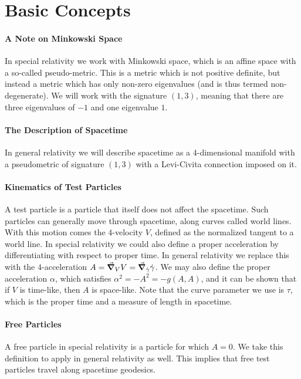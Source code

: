 \section{Basic Concepts}

\paragraph{A Note on Minkowski Space}
In special relativity we work with Minkowski space, which is an affine space with a so-called pseudo-metric. This is a metric which is not positive definite, but instead a metric which has only non-zero eigenvalues (and is thus termed non-degenerate). We will work with the signature $(1, 3)$, meaning that there are three eigenvalues of $-1$ and one eigenvalue $1$.

\paragraph{The Description of Spacetime}
In general relativity we will describe spacetime as a $4$-dimensional manifold with a pseudometric of signature $(1, 3)$ with a Levi-Civita connection imposed on it.

\paragraph{Kinematics of Test Particles}
A test particle is a particle that itself does not affect the spacetime. Such particles can generally move through spacetime, along curves called world lines. With this motion comes the $4$-velocity $V$, defined as the normalized tangent to a world line. In special relativity we could also define a proper acceleration by differentiating with respect to proper time. In general relativity we replace this with the $4$-acceleration $A = \grad_{V}{V} = \grad_{\dot{\gamma}}{\dot{\gamma}}$.  We may also define the proper acceleration $\alpha$, which satisfies $\alpha^{2} = -A^{2} = -g(A, A)$, and it can be shown that if $V$ is time-like, then $A$ is space-like. Note that the curve parameter we use is $\tau$, which is the proper time and a measure of length in spacetime.

\paragraph{Free Particles}
A free particle in special relativity is a particle for which $A = 0$. We take this definition to apply in general relativity as well. This implies that free test particles travel along spacetime geodesics.

